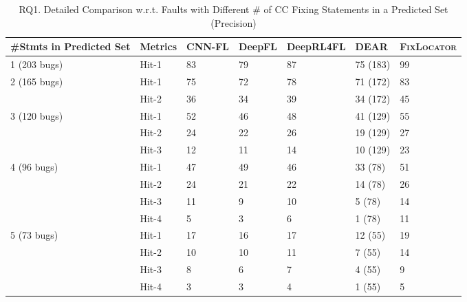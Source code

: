 \begin{table}[t]
	\caption{RQ1. Detailed Comparison w.r.t. Faults with Different \# of CC Fixing Statements in a Predicted Set (Precision)}
\vspace{-10pt}
        \tabcolsep 2pt
	{\small
		\begin{center}
			\renewcommand{\arraystretch}{1}
			\begin{tabular}{p{1.5cm}<{\centering}|p{0.8cm}<{\centering}|p{1cm}<{\centering}|p{0.8cm}<{\centering}|p{1.2cm}<{\centering}|p{0.9cm}<{\centering}|p{1.1cm}<{\centering}}
				\hline
				\#Stmts in Predicted Set & Metrics & CNN-FL & DeepFL & DeepRL4FL & DEAR & {\textsc{Fix\-Locator}\xspace} \\
				\hline
				\multirow{1}{*}{1 (203 bugs)}   & Hit-1  & 83 & 79 & 87 & 75 (183)& 99 \\
				\hline
				\multirow{2}{*}{2 (165 bugs)}  & Hit-1   & 75 & 72 & 78 & 71 (172) & 83 \\
				& Hit-2       						& 36 & 34 & 39 & 34 (172) & 45 \\
				\hline
				\multirow{3}{*}{3 (120 bugs)}  & Hit-1    & 52 & 46 & 48 & 41 (129) & 55 \\
				& Hit-2         					& 24 & 22 & 26 & 19 (129) & 27\\
				& Hit-3         				  	& 12 &11 & 14 & 10 (129) & 23 \\
				\hline
				\multirow{4}{*}{4 (96 bugs)}  & Hit-1    & 47 & 49 & 46 & 33 (78) & 51 \\
				& Hit-2        				    	 &24 & 21 & 22 & 14 (78) & 26 \\
				& Hit-3       					    & 11 & 9 & 10 & 5 (78) & 14 \\
				& Hit-4       					    & 5 & 3 & 6 & 1 (78) & 11 \\
				\hline 
				\multirow{5}{*}{5 (73 bugs)}  & Hit-1    & 17 & 16 & 17 & 12 (55) & 19 \\
				& Hit-2       						  & 10 & 10 & 11 & 7 (55) &14 \\
				& Hit-3       						  & 8 & 6 & 7 & 4 (55) &9 \\
				& Hit-4         					  & 3 & 3 & 4 & 1 (55) &5 \\

\end{tabular}
\end{center}}
\end{table}
